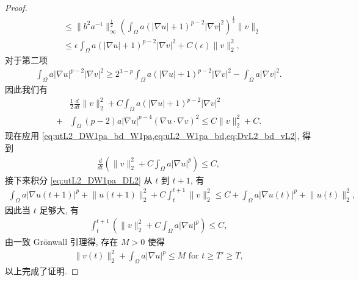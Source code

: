 \documentclass[oneside,longtitle]{LZUthesis}
\theoremstyle{definition}
\numberwithin{equation}{chapter}
\newcommand*\abs[1]{\lvert#1\rvert}
\newcommand*\norm[1]{\lVert#1\rVert}
\begin{document}
\begin{proof}
\begin{equation}
\begin{split}
			&\leq \norm{b^2 a^{-1}}_{\infty}^{\frac{1}{2}}
			\left(\int_{\Omega}a\left(\abs{\nabla u}+1\right)^{p-2}\abs{\nabla v}^2\right)^{\frac{1}{2}}\norm{v}_2\\
			&\leq \epsilon \int_{\Omega}a\left(\abs{\nabla u}+1\right)^{p-2}\abs{\nabla v}^2
			+ C(\epsilon) \norm{v}_2^2,
		\end{split}
	\end{equation}
	对于第二项
	\begin{equation}
		\begin{split}
			\int_{\Omega}a\abs{\nabla u}^{p-2}\abs{\nabla v}^2
			\geq 2^{3-p}\int_{\Omega}a\left(\abs{\nabla u}+1\right)^{p-2}\abs{\nabla v}^2
			- \int_{\Omega}a\abs{\nabla v}^2.
		\end{split}
	\end{equation}
	因此我们有
	\begin{equation}\label{eq:DvL2_bd_vL2}
		\begin{split}
			& \frac{1}{2}\frac{d}{dt}\norm{v}_2^2
			+ C\int_{\Omega}a\left(\abs{\nabla u}+1\right)^{p-2}\abs{\nabla v}^2\\
			+{} & \int_{\Omega}\left(p-2\right)a\abs{\nabla u}^{p-4}\left(\nabla u
			\cdot \nabla v\right)^2
			\leq C\norm{v}_2^2 + C.
		\end{split}
	\end{equation}
	现在应用 \cref{eq:utL2_DW1pa_bd_W1pa,eq:uL2_W1pa_bd,eq:DvL2_bd_vL2},
	得到
	\begin{equation}
		\begin{split}
			\frac{d}{dt}\left(
			\norm{v}_2^2 + C\int_{\Omega}a\abs{\nabla u}^p
			\right)
			\leq C,
		\end{split}
	\end{equation}
	接下来积分 \cref{eq:utL2_DW1pa_DL2} 从 $t$ 到 $t+1$, 有
	\begin{equation}
		\begin{split}
			\int_{\Omega}a\abs{\nabla u(t+1)}^p
			+ \norm{u(t+1)}_2^2
			+ C\int_t^{t+1}\norm{v}_2^2
			\leq C + \int_{\Omega}a\abs{\nabla u(t)}^p
			+ \norm{u(t)}_2^2,
		\end{split}
	\end{equation}
	因此当 $t$ 足够大, 有
	\begin{equation}
		\begin{split}
			\int_t^{t+1}\left(
			\norm{v}_2^2 + C\int_{\Omega}a\abs{\nabla u}^p
			\right) \leq C,
		\end{split}
	\end{equation}
	由一致 Gr\"onwall 引理得, 存在 $M > 0$ 使得
	\begin{equation}
		\begin{split}
			\norm{v(t)}_2^2
			+ \int_{\Omega}a\abs{\nabla u}^p \leq M \text{ for } t \geq T' \geq T,
		\end{split}
	\end{equation}
	以上完成了证明.
\end{proof}
\end{document}
